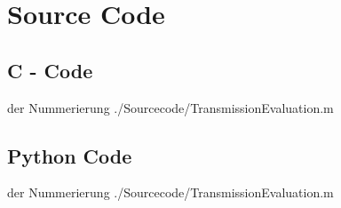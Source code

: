 \chapter{Source Code}
\label{appendixSoureCode}

\newpage
\section{C - Code}
%
 der Nummerierung 
		{./Sourcecode/TransmissionEvaluation.m} %
		

\newpage
\section{Python Code}
%
 der Nummerierung 
		{./Sourcecode/TransmissionEvaluation.m} %

